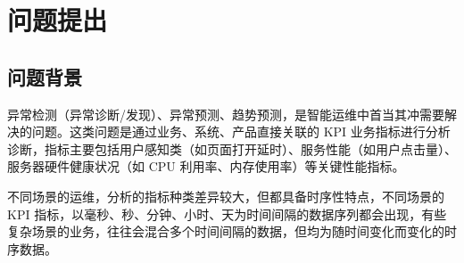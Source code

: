 \documentclass{HighSchoolBigDataCompetition}
\begin{document}
	\begin{abstract}
		请使用 \TeX Live 2019，XeLaTeX 编译，请选用支持 UTF­-8 编码的编辑器。

		使用者需要有一定的 \LaTeX{} 的使用经验（{\heiti 任务期三个月以内不建议使用 \LaTeX}，因此本文没有介绍基础使用），至少要会使用常用宏包的一些功能，比如参考文献，数学公式，图片使用，列表环境等等。模板已经添加了常用的宏包，无需用户再额外添加。
		
		本模板
		\begin{itemize}
			\item 定义了几个宏 \lstinline|\def\ee{\mathrm{e}},\def\ii{\mathrm{i}},\def\leq{\leqslant},\def\geq{\geqslant}| 方便使用；
			\item 图片应放在 \lstinline|figure| 文件夹中；
			\item 定制了 matlab 和 python 代码环境，使用方法：\lstinline|\begin{matlab} content \end{matlab}| 和 \lstinline|\begin{python} content \end{python}|；
			\item 加载了 \lstinline|cleveref| 宏包，使用方法：\lstinline|\cref{label}|。
		\end{itemize}
		其它的就是跟普通的 \lstinline|ctexart| 使用方法一样。
	\end{abstract}
	\tableofcontents\newpage
	\section{问题提出}
	\subsection{问题背景}
	异常检测（异常诊断/发现）、异常预测、趋势预测，是智能运维中首当其冲需要解决的问题。这类问题是通过业务、系统、产品直接关联的 KPI 业务指标进行分析诊断，指标主要包括用户感知类（如页面打开延时）、服务性能（如用户点击量）、服务器硬件健康状况（如 CPU 利用率、内存使用率）等关键性能指标。

	不同场景的运维，分析的指标种类差异较大，但都具备时序性特点，不同场景的 KPI 指标，以毫秒、秒、分钟、小时、天为时间间隔的数据序列都会出现，有些复杂场景的业务，往往会混合多个时间间隔的数据，但均为随时间变化而变化的时序数据。
\end{document}
